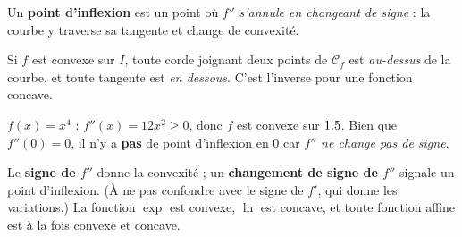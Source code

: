 \begin{definition}
Un \textbf{point d'inflexion} est un point où $f''$ \emph{s'annule en changeant de signe} :
la courbe y traverse sa tangente et change de convexité.
\end{definition}

\begin{propriete}
Si $f$ est convexe sur $I$, toute corde joignant deux points de $\mathcal C_f$ est
\emph{au-dessus} de la courbe, et toute tangente est \emph{en dessous}. C'est l'inverse
pour une fonction concave.
\end{propriete}

\begin{illus}
\end{illus}

\begin{exemple}
$f(x)=x^{4}$ : $f''(x)=12x^{2}\ge0$, donc $f$ est convexe sur $1.5$. Bien que $f''(0)=0$,
il n'y a \textbf{pas} de point d'inflexion en $0$ car $f''$ \emph{ne change pas de signe}.
\end{exemple}

\begin{aretenir}
Le \textbf{signe de $f''$} donne la convexité ; un \textbf{changement de signe de $f''$} signale
un point d'inflexion. (À ne pas confondre avec le signe de $f'$, qui donne les variations.)
La fonction $\exp$ est convexe, $\ln$ est concave, et toute fonction affine est à la fois
convexe et concave.
\end{aretenir}

